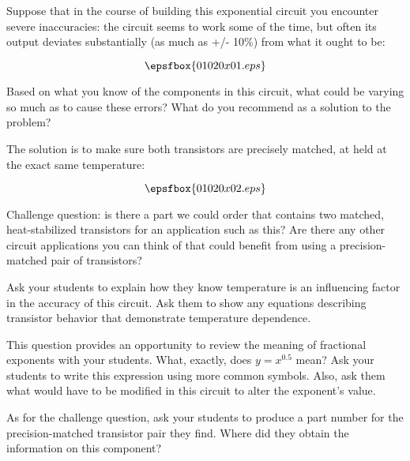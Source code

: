

Suppose that in the course of building this exponential circuit you encounter severe inaccuracies: the circuit seems to work some of the time, but often its output deviates substantially (as much as +/- 10\%) from what it ought to be:

$$\epsfbox{01020x01.eps}$$

Based on what you know of the components in this circuit, what could be varying so much as to cause these errors?  What do you recommend as a solution to the problem?







The solution is to make sure both transistors are precisely matched, at held at the exact same temperature:

$$\epsfbox{01020x02.eps}$$

\vskip 10pt

Challenge question: is there a part we could order that contains two matched, heat-stabilized transistors for an application such as this?  Are there any other circuit applications you can think of that could benefit from using a precision-matched pair of transistors?







Ask your students to explain how they know temperature is an influencing factor in the accuracy of this circuit.  Ask them to show any equations describing transistor behavior that demonstrate temperature dependence.

This question provides an opportunity to review the meaning of fractional exponents with your students.  What, exactly, does $y = x^{0.5}$ mean?  Ask your students to write this expression using more common symbols.  Also, ask them what would have to be modified in this circuit to alter the exponent's value.

As for the challenge question, ask your students to produce a part number for the precision-matched transistor pair they find.  Where did they obtain the information on this component?




